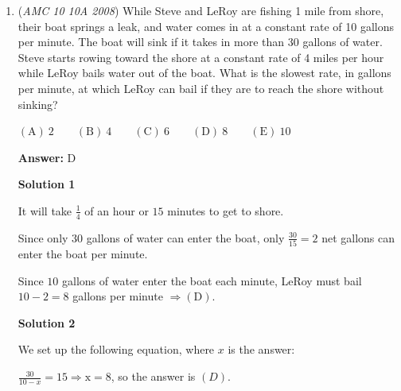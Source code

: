 \begin{enumerate}
Since the area of the large square is $16$, the side length equals $4$. If all sides are bisected, the resulting square has side length $2\sqrt{2}$, thus making the area $8$. If we repeat this process again, we notice that the area is just half that of the previous square, so the area of $S_{3} = 4 \longrightarrow \fbox{E}$




\textbf{Solution 2}

Since the length ratio is $\frac{1}{\sqrt{2}}$, then the area ratio is $\frac{1}{2}$ (since the area ratio between two similar 2-dimensional objects is equal to the side ratio of those objects squared). This means that $S_2 = 8$ and $S_3 = \boxed{\textbf{(E) }4}$.

 


	\item (\textit{AMC 10 10A 2008}) While Steve and LeRoy are fishing 1 mile from shore, their boat springs a leak, and water comes in at a constant rate of 10 gallons per minute. The boat will sink if it takes in more than 30 gallons of water. Steve starts rowing toward the shore at a constant rate of 4 miles per hour while LeRoy bails water out of the boat. What is the slowest rate, in gallons per minute, at which LeRoy can bail if they are to reach the shore without sinking?


 $\mathrm{(A)}\ 2\qquad\mathrm{(B)}\ 4\qquad\mathrm{(C)}\ 6\qquad\mathrm{(D)}\ 8\qquad\mathrm{(E)}\ 10$

 \textbf{Answer: }D



\textbf{Solution 1}

It will take $\frac{1}{4}$ of an hour or $15$ minutes to get to shore.

 Since only $30$ gallons of water can enter the boat, only $\frac{30}{15}=2$ net gallons can enter the boat per minute.

 Since $10$ gallons of water enter the boat each minute, LeRoy must bail $10-2=8$ gallons per minute $\Rightarrow\mathrm{(D)}$.

 


 



\textbf{Solution 2}

We set up the following equation, where $x$ is the answer:

 $\frac{30}{10-x} = 15 \Rightarrow\mathrm{x=8}$, so the answer is $(D)$.

 




\end{enumerate}
